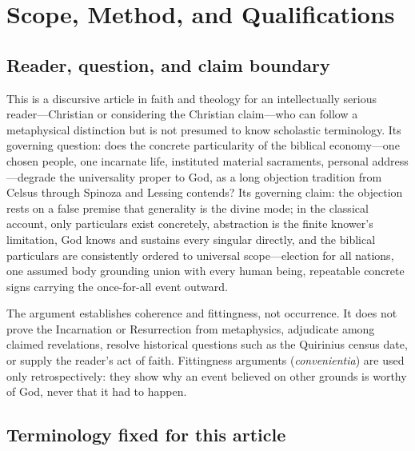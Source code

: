 \section{Scope, Method, and Qualifications}

\subsection{Reader, question, and claim boundary}

This is a discursive article in faith and theology for an intellectually serious reader---Christian or considering the Christian claim---who can follow a metaphysical distinction but is not presumed to know scholastic terminology. Its governing question: does the concrete particularity of the biblical economy---one chosen people, one incarnate life, instituted material sacraments, personal address---degrade the universality proper to God, as a long objection tradition from Celsus through Spinoza and Lessing contends? Its governing claim: the objection rests on a false premise that generality is the divine mode; in the classical account, only particulars exist concretely, abstraction is the finite knower's limitation, God knows and sustains every singular directly, and the biblical particulars are consistently ordered to universal scope---election for all nations, one assumed body grounding union with every human being, repeatable concrete signs carrying the once-for-all event outward.

The argument establishes coherence and fittingness, not occurrence. It does not prove the Incarnation or Resurrection from metaphysics, adjudicate among claimed revelations, resolve historical questions such as the Quirinius census date, or supply the reader's act of faith. Fittingness arguments (\emph{convenientia}) are used only retrospectively: they show why an event believed on other grounds is worthy of God, never that it had to happen.

\subsection{Terminology fixed for this article}

